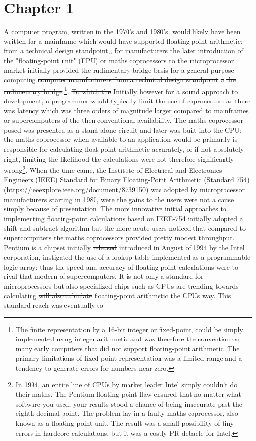 \documentclass[7pt]{article}
\begin{document}
	
	\section*{Chapter 1}

A computer program, written in the 1970's and 1980's, would likely have been written for a mainframe which would have supported floating-point arithmetic; from a technical design standpoint,, for manufacturers the later introduction of the "floating-point unit" (FPU) or maths coprocessors to the microprocessor market \st{initially} provided the rudimentary bridge \st{basis} for \st{a} general purpose computing \st{computer manufacturers from a technical design standpoint} \st{a} \st{the rudimentary bridge} \footnote{The finite representation by a 16-bit integer or fixed-point, could be simply implemented using integer arithmetic and was therefore the convention on many early computers that did not support floating-point arithmetic. The primary limitations of fixed-point representation was a limited range and a tendency to generate errors for numbers near zero.}. \st{To which the} Initially  however for a  sound approach to development, a programmer would typically limit the use of coprocessors as there was latency which was three orders of magnitude larger compared to mainframes or supercomputers of the then conventional availability. The maths coprocessor \st{posed} was presented as a stand-alone circuit and later was built into the CPU: the  maths coprocessor when available to an application {would be} primarily \st{is} responsible for calculating float-point arithmetic accurately, or if not absolutely right, limiting the likelihood the calculations were not therefore significantly wrong\footnote{In 1994, an entire line of CPUs by market leader Intel simply couldn't do their maths. The Pentium floating-point flaw ensured that no matter what software you used, your results stood a chance of being inaccurate past the eighth decimal point. The problem lay in a faulty maths coprocessor, also known as a floating-point unit. The result was a small possibility of tiny errors in hardcore calculations, but it was a costly PR debacle for Intel.}.  When the time came, the Institute of Electrical and Electronics Engineers (IEEE) Standard for Binary Floating-Point Arithmetic (Standard 754) (https://ieeexplore.ieee.org/document/8739150) was adopted by microprocessor manufacturers starting in 1980, were the gains to the users were not a cause simply because of presentation. The more innovative initial approaches to implementing floating-point calculations based on IEEE-754 initially adopted a shift-and-subtract algorithm but the more acute users noticed that compared to supercomputers the maths coprocessors provided pretty modest throughput. Pentium is a chipset initially \st{released} introduced in August of 1994 by the Intel corporation, instigated the use of a lookup table implemented as a programmable logic array: thus the speed and accuracy of floating-point calculations were to rival that modern of supercomputers. It is not only a standard for microprocessors but also specialized chips such as GPUs are trending towards calculating \st{will also calculate} floating-point arithmetic the CPUs way. This standard reach was eventually to 
\end{document}
